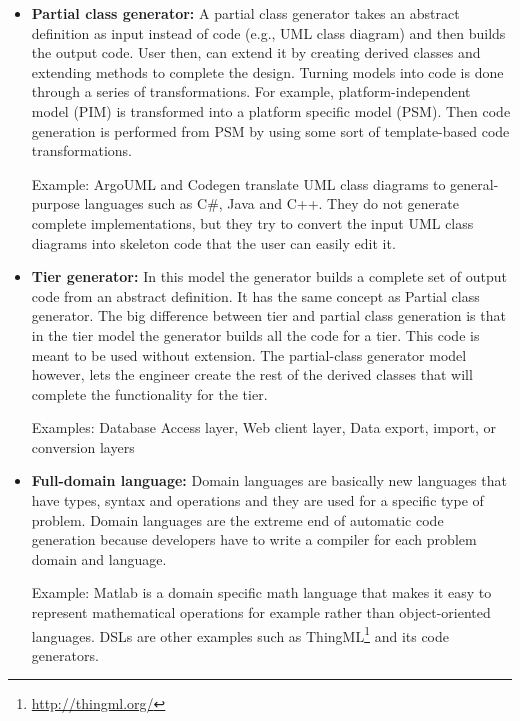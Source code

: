 \begin{itemize}
\item \textbf{Partial class generator:} A partial class generator takes an abstract definition as input instead of code (e.g., UML class diagram) and then builds the output code. User then, can extend it by creating derived classes and extending methods to complete the design. Turning models into code is done through a series of transformations. For example, platform-independent model (PIM) is transformed into a platform specific model (PSM). Then code generation is performed from PSM by using some sort of template-based code transformations.

Example: ArgoUML and Codegen translate UML class diagrams to general-purpose languages such as C\#, Java and C++. They do not generate complete implementations, but they try to convert the input UML class diagrams into skeleton code that the user can easily edit it. 

\item \textbf{Tier generator:} In this model the generator builds a complete set of output code from an abstract definition. It has the same concept as Partial class generator. The big difference between tier and partial class generation is that in the tier model the generator builds all the code for a tier. This code is meant to be used without extension. The partial-class generator model however, lets the engineer create the rest of the derived classes that will complete the functionality for the tier.

Examples: Database Access layer, Web client layer, Data export, import, or conversion layers

\item \textbf{Full-domain language:} Domain languages are basically new languages that have types, syntax and operations and they are used for a specific type of problem. 
Domain languages are the extreme end of automatic code generation because developers have to write a compiler for each problem domain and language. 

Example: Matlab is a domain specific math language that makes it easy to represent mathematical operations for example rather than object-oriented languages. DSLs are other examples such as ThingML\footnote{\url{http://thingml.org/}} and its code generators.

\end{itemize}
